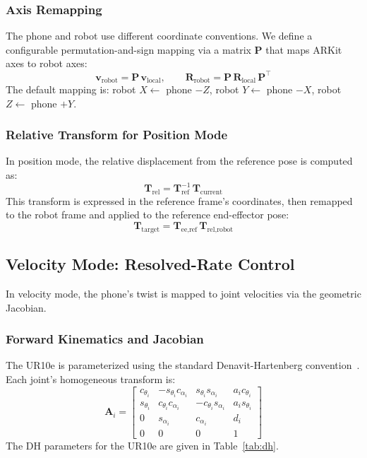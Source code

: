 \subsubsection{Axis Remapping}

The phone and robot use different coordinate conventions. We define a configurable permutation-and-sign mapping via a matrix $\mathbf{P}$ that maps ARKit axes to robot axes:
\begin{equation}
    \mathbf{v}_\text{robot} = \mathbf{P} \, \mathbf{v}_\text{local}, \qquad
    \mathbf{R}_\text{robot} = \mathbf{P} \, \mathbf{R}_\text{local} \, \mathbf{P}^\top
\end{equation}
The default mapping is: robot $X \leftarrow$ phone $-Z$, robot $Y \leftarrow$ phone $-X$, robot $Z \leftarrow$ phone $+Y$.

\subsubsection{Relative Transform for Position Mode}

In position mode, the relative displacement from the reference pose is computed as:
\begin{equation}
    \mathbf{T}_\text{rel} = \mathbf{T}_\text{ref}^{-1} \, \mathbf{T}_\text{current}
\end{equation}
This transform is expressed in the reference frame's coordinates, then remapped to the robot frame and applied to the reference end-effector pose:
\begin{equation}
    \mathbf{T}_\text{target} = \mathbf{T}_\text{ee,ref} \, \mathbf{T}_\text{rel,robot}
\end{equation}


\subsection{Velocity Mode: Resolved-Rate Control}

In velocity mode, the phone's twist is mapped to joint velocities via the geometric Jacobian.

\subsubsection{Forward Kinematics and Jacobian}

The UR10e is parameterized using the standard Denavit-Hartenberg convention~\cite{murray1994}. Each joint's homogeneous transform is:
\begin{equation}
    \mathbf{A}_i = \begin{bmatrix}
        c_{\theta_i} & -s_{\theta_i} c_{\alpha_i} & s_{\theta_i} s_{\alpha_i} & a_i c_{\theta_i} \\
        s_{\theta_i} & c_{\theta_i} c_{\alpha_i} & -c_{\theta_i} s_{\alpha_i} & a_i s_{\theta_i} \\
        0 & s_{\alpha_i} & c_{\alpha_i} & d_i \\
        0 & 0 & 0 & 1
    \end{bmatrix}
    \label{eq:dh_transform}
\end{equation}
The DH parameters for the UR10e are given in Table~\ref{tab:dh}.

